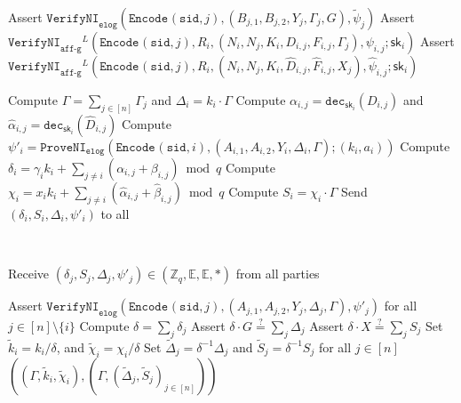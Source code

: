 \documentclass[11pt]{article}
\newcommand{\dec}{\ensuremath{\mathtt{dec}}}
\newcommand{\sid}{\ensuremath{\mathtt{sid}}}
\newcommand{\proveni}[1]{\ensuremath{\mathtt{ProveNI}_{\mathtt{#1}}}}
\newcommand{\verifyni}[1]{\ensuremath{\mathtt{VerifyNI}_{\mathtt{#1}}}}
\newcommand{\Encode}[1][]{\ensuremath{\mathtt{Encode}_{\mathtt{#1}}}}
\newcommand{\sk}{\textsf{sk}}
\newcommand{\E}{\mathbb{E}}
\newcommand{\Z}{\mathbb{Z}}
\newcommand{\?}[1]{\stackrel{?}{#1}}
\begin{document}
\begin{description}
\begin{algorithmic}[1]
            \State Assert $\verifyni{elog}(\Encode(\sid, j), (B_{j,1}, B_{j,2}, Y_j, \Gamma_j, G), \tilde \psi_j)$
            \State Assert $\verifyni{aff\mbox{-}g}^L(\Encode(\sid, j), R_i, (N_i, N_j, K_i, D_{i,j}, F_{i,j}, \Gamma_j), \psi_{i,j}; \sk_i)$
            \State Assert $\verifyni{aff\mbox{-}g}^L(\Encode(\sid, j), R_i, (N_i, N_j, K_i, \hat{D}_{i,j}, \hat{F}_{i,j}, X_j), \hat{\psi}_{i,j}; \sk_i)$
        \EndFor
        \Statex

        \State Compute $\Gamma = \sum_{j\in [n]} \Gamma_j$ and $\Delta_i = k_i \cdot \Gamma$
            \State Compute $\alpha_{i,j} = \dec_{\sk_i}(D_{i,j})$ and $\hat{\alpha}_{i,j} = \dec_{\sk_i}(\hat{D}_{i,j})$
        \EndFor
        \State Compute $\psi'_i = \proveni{elog}(\Encode(\sid, i), (A_{i,1}, A_{i,2}, Y_i, \Delta_i, \Gamma); (k_i, a_i))$
        \State Compute $\delta_i = \gamma_i k_i + \sum_{j \ne i}(\alpha_{i,j} + \beta_{i,j}) \bmod q$
        \State Compute $\chi_i = x_i k_i + \sum_{j \ne i}(\hat{\alpha}_{i,j} + \hat{\beta}_{i,j}) \bmod q$
        \State Compute $S_i = \chi_i \cdot \Gamma$
        \Statex
        \State Send $(\delta_i, S_i, \Delta_i, \psi'_i)$ to all
    \end{algorithmic}

    \item[\textbf{Output}] \
    \begin{algorithmic}[1]
        \State Receive $(\delta_j, S_j, \Delta_j, \psi'_j) \in (\Z_q, \E, \E, *)$ from all parties

        \State Assert $\verifyni{elog}(\Encode(\sid, j), (A_{j,1}, A_{j,2}, Y_j, \Delta_j, \Gamma), \psi'_j)$
            for all $j \in [n] \setminus \{i\}$
        \State Compute $\delta = \sum_j \delta_j$
        \State Assert $\delta \cdot G \? = \sum_j \Delta_j$
        \State Assert $\delta \cdot X \? = \sum_j S_j$
        \State Set $\tilde k_i = k_i / \delta$, and $\tilde \chi_i = \chi_i / \delta$
        \State Set $\tilde \Delta_j = \delta^{-1} \Delta_j$ and $\tilde S_j = \delta^{-1} S_j$ for all $j \in [n]$
        \State \Return $((\Gamma, \tilde k_i, \tilde \chi_i), (\Gamma, (\tilde \Delta_j, \tilde S_j)_{j \in [n]}))$
    \end{algorithmic}
\end{description}
\end{document}
